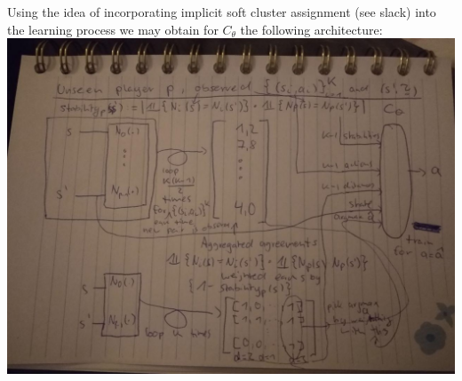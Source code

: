 \documentclass[a4paper, 11pt]{article}
\begin{document}
	Using the idea of incorporating implicit soft cluster assignment (see slack) into the learning process we may obtain for $C_\theta$ the following architecture:\\
	
	\includegraphics[scale=.5]{architecture}
	
	
	
	
	
\end{document}
